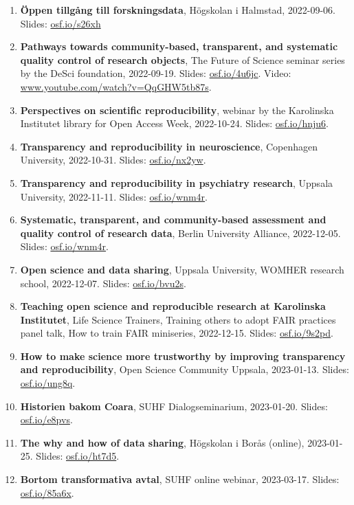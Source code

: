 \documentclass[10pt]{article}
\begin{document}
\begin{enumerate}[nolistsep]
\item \textbf{Öppen tillgång till forskningsdata}, Högskolan i Halmstad, 2022-09-06. Slides: \href{https://osf.io/s26xh}{osf.io/s26xh}
\item \textbf{Pathways towards community-based, transparent, and systematic quality control of research objects}, The Future of Science seminar series by the DeSci foundation, 2022-09-19. Slides: \href{https://osf.io/4u6jc}{osf.io/4u6jc}. Video: \href{https://www.youtube.com/watch?v=QqGHW5tb87s}{www.youtube.com/watch?v=QqGHW5tb87s}.
\item \textbf{Perspectives on scientific reproducibility}, webinar by the Karolinska Institutet library for Open Access Week, 2022-10-24. Slides: \href{https://osf.io/hnju6}{osf.io/hnju6}.
\item \textbf{Transparency and reproducibility in neuroscience}, Copenhagen University, 2022-10-31. Slides: \href{https://osf.io/nx2yw}{osf.io/nx2yw}.
\item \textbf{Transparency and reproducibility in psychiatry research}, Uppsala University, 2022-11-11. Slides: \href{https://osf.io/wnm4r}{osf.io/wnm4r}.
\item \textbf{Systematic, transparent, and community-based assessment and quality control of research data}, Berlin University Alliance, 2022-12-05. Slides: \href{https://osf.io/wnm4r}{osf.io/wnm4r}.
\item \textbf{Open science and data sharing}, Uppsala University, WOMHER research school, 2022-12-07. Slides: \href{https://osf.io/bvu2s}{osf.io/bvu2s}.
\item \textbf{Teaching open science and reproducible research at Karolinska Institutet}, Life Science Trainers, Training others to adopt FAIR practices panel talk, How to train FAIR miniseries, 2022-12-15. Slides: \href{https://osf.io/9s2pd}{osf.io/9s2pd}.
\item \textbf{How to make science more trustworthy by improving transparency and reproducibility}, Open Science Community Uppsala, 2023-01-13. Slides: \href{https://osf.io/ung8q}{osf.io/ung8q}.
\item \textbf{Historien bakom Coara}, SUHF Dialogseminarium, 2023-01-20. Slides: \href{https://osf.io/e8pvs}{osf.io/e8pvs}.
\item \textbf{The why and how of data sharing}, Högskolan i Borås (online), 2023-01-25. Slides: \href{https://osf.io/ht7d5}{osf.io/ht7d5}.
\item \textbf{Bortom transformativa avtal}, SUHF online webinar, 2023-03-17. Slides: \href{https://osf.io/85a6x}{osf.io/85a6x}.

\end{enumerate}
\end{document}
